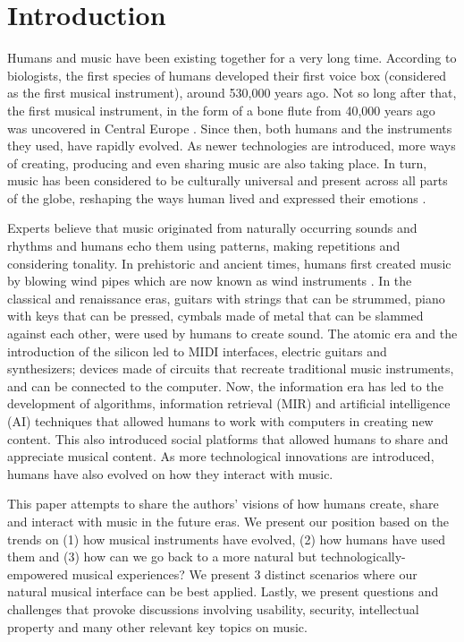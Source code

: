 \documentclass[acmtog]{acmart}
\begin{document}
\section{Introduction}
Humans and music have been existing together for a very long time. According to biologists, the first species of humans developed their first voice box (considered as the first musical instrument), around 530,000 years ago. Not so long after that, the first musical instrument, in the form of a bone flute from 40,000 years ago was uncovered in Central Europe \cite{higham2012tauesting}. Since then, both humans and the instruments they used, have rapidly evolved. As newer technologies are introduced, more ways of creating, producing and even sharing music \cite{voida2005listening} are also taking place. In turn, music has been considered to be culturally universal \cite{campbell1997music, seeger1971reflections} and present across all parts of the globe, reshaping the ways human lived and expressed their emotions \cite{juslin2001music}.

Experts believe that music originated from naturally occurring sounds and rhythms and humans echo them using patterns, making repetitions and considering tonality. In prehistoric and ancient times, humans first created music by blowing wind pipes which are now known as wind instruments \cite{conard2009female}. In the classical and renaissance eras, guitars with strings that can be strummed, piano with keys that can be pressed, cymbals made of metal that can be slammed against each other, were used by humans to create sound. The atomic era and the introduction of the silicon led to MIDI interfaces, electric guitars and synthesizers; devices made of circuits that recreate traditional music instruments, and can be connected to the computer. Now, the information era has led to the development of algorithms, information retrieval (MIR) and artificial intelligence (AI) techniques that allowed humans to work with computers in creating new content. This also introduced social platforms that allowed humans to share and appreciate musical content. As more technological innovations are introduced, humans have also evolved on how they interact with music. 

This paper attempts to share the authors' visions of how humans create, share and interact with music in the future eras. We present our position based on the trends on (1) how musical instruments have evolved, (2) how humans have used them and (3) how can we go back to a more natural but technologically-empowered musical experiences? We present 3 distinct scenarios where our natural musical interface can be best applied. Lastly, we present questions and challenges that provoke discussions involving usability, security, intellectual property and many other relevant key topics on music. 
\end{document}
